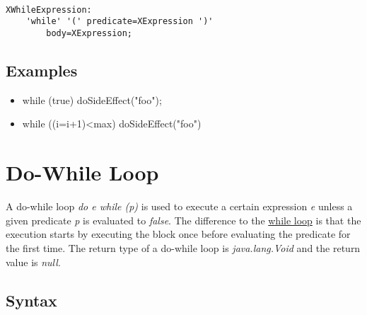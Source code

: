 \documentclass[a4paper,10pt]{scrreprt}
\newlength{\itemindentlen}
\begin{document}
\begin{lstlisting}

XWhileExpression:
	'while' '(' predicate=XExpression ')'
		body=XExpression;

\end{lstlisting}
 




\subsection{ Examples }


\setlength{\itemindentlen}{\textwidth}
\begin{itemize}
\addtolength{\itemindentlen}{-2em}

\item \begin{minipage}[t]{\itemindentlen}

	while (true) {
		doSideEffect("foo");
	}
	
\end{minipage}

\item \begin{minipage}[t]{\itemindentlen}

	while ((i=i+1)<max) doSideEffect("foo")
	
\end{minipage}

\end{itemize}
\addtolength{\itemindentlen}{2em}







\section{Do-While Loop}
\label{DoWhileExpression}

A do-while loop \emph{do e while (p)} is used to execute a certain expression \emph{e} unless a given predicate \emph{p} is evaluated to \emph{false}.
The difference to the 
\hyperref[WhileExpression]{while loop} is that the execution starts by executing the block once before evaluating the predicate for the first time.
The return type of a do-while loop is \emph{java.lang.Void} and the return value is \emph{null}.

\subsection{ Syntax }
\end{document}
